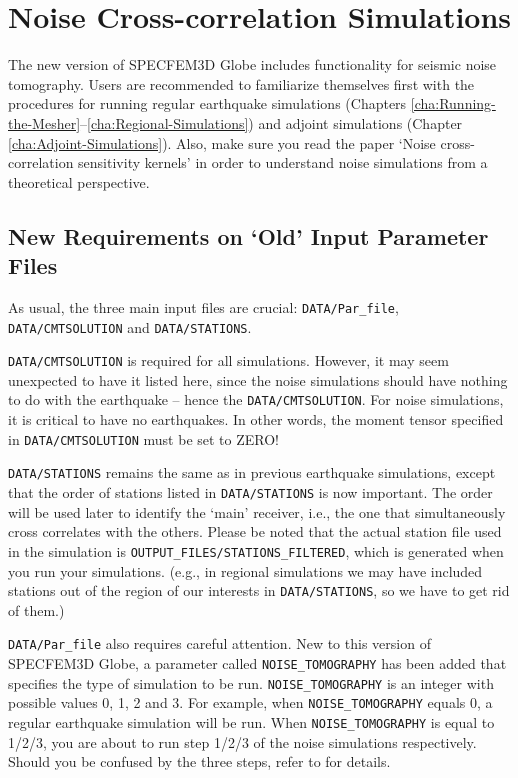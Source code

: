 \chapter{Noise Cross-correlation Simulations}


The new version of SPECFEM3D Globe includes functionality for seismic noise tomography.
Users are recommended to familiarize themselves first with the procedures for running regular earthquake
simulations (Chapters \ref{cha:Running-the-Mesher}--\ref{cha:Regional-Simulations}) and
adjoint simulations (Chapter \ref{cha:Adjoint-Simulations}).
Also, make sure you read the paper `Noise cross-correlation sensitivity kernels' \citep{trompetal2010}
in order to understand noise simulations from a theoretical perspective.

\section{New Requirements on `Old' Input Parameter Files}

As usual, the three main input files are crucial: \texttt{DATA/Par\_file}, \texttt{DATA/CMTSOLUTION} and
\texttt{DATA/STATIONS}.\newline


\texttt{DATA/CMTSOLUTION} is required for all simulations. However, it may seem unexpected to have it listed here, since the
noise simulations should have nothing to do with the earthquake -- hence the \texttt{DATA/CMTSOLUTION}.
For noise simulations, it is critical to have no earthquakes. In other words, the moment tensor
specified in \texttt{DATA/CMTSOLUTION} must be set to ZERO! \newline


\texttt{DATA/STATIONS} remains the same as in previous earthquake simulations,
except that the order of stations listed in \texttt{DATA/STATIONS} is now important.
The order will be used later to identify the `main' receiver,
i.e., the one that simultaneously cross correlates with the others.
Please be noted that the actual station file used in the simulation is \texttt{OUTPUT\_FILES/STATIONS\_FILTERED},
which is generated when you run your simulations. (e.g., in regional simulations we may have included stations out of the
region of our interests in \texttt{DATA/STATIONS}, so we have to get rid of them.)\newline


\texttt{DATA/Par\_file} also requires careful attention.
New to this version of SPECFEM3D Globe, a parameter called \texttt{NOISE\_TOMOGRAPHY} has been added that specifies the type of simulation to be run.
\texttt{NOISE\_TOMOGRAPHY} is an integer with possible values 0, 1, 2 and 3.
For example, when \texttt{NOISE\_TOMOGRAPHY} equals 0, a regular earthquake simulation will be run.
When \texttt{NOISE\_TOMOGRAPHY} is equal to 1/2/3, you are about to run
step 1/2/3 of the noise simulations respectively.
Should you be confused by the three steps, refer to \citet{trompetal2010} for details.\newline


